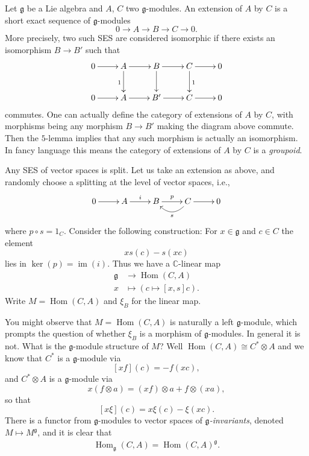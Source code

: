 \documentclass[12pt]{article}
\theoremstyle{plain}
\theoremstyle{definition}
\numberwithin{equation}{section}
\DeclareMathOperator{\Hom}{Hom}
\DeclareMathOperator{\img}{im}
\newcommand{\C}{\mathbb{C}}
\newcommand{\g}{\mathfrak{g}}
\begin{document}
Let $\g$ be a Lie algebra and $A$, $C$ two $\g$-modules. An extension of $A$ by $C$ is a short exact sequence of $\g$-modules
\[
0 \rightarrow A \rightarrow B \rightarrow C \rightarrow 0.
\]
More precisely, two such SES are considered isomorphic if there exists an isomorphism $B \rightarrow B'$ such that
\begin{align*}
\xymatrix{
0 \ar@{->}[r] & A \ar@{->}[r] \ar@{->}[d]_{1} & B \ar@{->}[r] \ar@{->}[d] & C \ar@{->}[r] \ar@{->}[d]^{1} & 0 \\
%
0 \ar@{->}[r] & A \ar@{->}[r] & B' \ar@{->}[r] & C \ar@{->}[r] & 0 \\
}
\end{align*}
commutes. One can actually define the category of extensions of $A$ by $C$, with morphisms being any morphism $B \rightarrow B'$ making the diagram above commute. Then the $5$-lemma implies that any such morphism is actually an isomorphism. In fancy language this means the category of extensions of $A$ by $C$ is a \emph{groupoid}.

Any SES of vector spaces is split. Let us take an extension as above, and randomly choose a splitting at the level of vector spaces, i.e.,
\begin{align*}
\xymatrix{
0 \ar@{->}[r] & A \ar@{->}[r]^{i} & B \ar@{->}[r]^{p} & C \ar@{->}[r] \ar@/^1.0pc/@[][l]^{s} & 0 \\
}
\end{align*}
where $p \circ s = 1_C$. Consider the following construction: For $x \in \g$ and $c \in C$ the element
\[
x s(c) - s(x c)
\]
lies in $\ker(p) = \img(i)$. Thus we have a $\C$-linear map
\begin{align*}
\g &\rightarrow \Hom(C, A) \\
%
x &\mapsto (c \mapsto [x, s] c).
\end{align*}
Write $M = \Hom(C, A)$ and $\xi_B$ for the linear map.

You might observe that $M = \Hom(C, A)$ is naturally a left $\g$-module, which prompts the question of whether $\xi_B$ is a morphism of $\g$-modules. In general it is not. What is the $\g$-module structure of $M$? Well $\Hom(C, A) \cong C^* \otimes A$ and we know that $C^*$ is a $\g$-module via
\[
[x f](c) = -f(xc),
\]
and $C^* \otimes A$ is a $\g$-module via
\[
x(f \otimes a) = (xf) \otimes a + f \otimes (xa),
\]
so that
\[
[x\xi](c) = x\xi(c) - \xi(xc).
\]
There is a functor from $\g$-modules to vector spaces of \emph{$\g$-invariants}, denoted $M \mapsto M^\g$, and it is clear that
\begin{align*}
\Hom_\g(C, A) = \Hom(C, A)^{\g}.
\end{align*}
\end{document}
